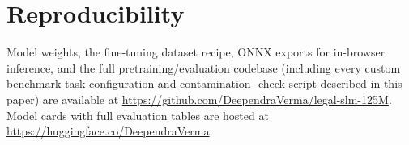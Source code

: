 \documentclass[11pt]{article}
\begin{document}
\section*{Reproducibility}

Model weights, the fine-tuning dataset recipe, ONNX exports for
in-browser inference, and the full pretraining/evaluation codebase
(including every custom benchmark task configuration and contamination-
check script described in this paper) are available at
\url{https://github.com/DeependraVerma/legal-slm-125M}. Model cards with
full evaluation tables are hosted at
\url{https://huggingface.co/DeependraVerma}.



\end{document}
